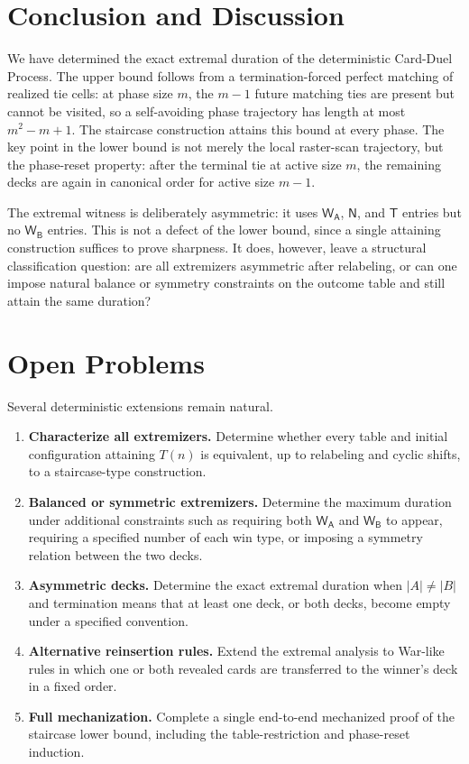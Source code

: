 \documentclass[12pt]{article}
\newcommand{\WA}{\mathsf{W_A}}
\newcommand{\WB}{\mathsf{W_B}}
\newcommand{\TT}{\mathsf{T}}
\newcommand{\NN}{\mathsf{N}}
\begin{document}
\section{Conclusion and Discussion}
We have determined the exact extremal duration of the deterministic Card-Duel Process. The upper bound follows from a termination-forced perfect matching of realized tie cells: at phase size $m$, the $m-1$ future matching ties are present but cannot be visited, so a self-avoiding phase trajectory has length at most $m^2-m+1$. The staircase construction attains this bound at every phase. The key point in the lower bound is not merely the local raster-scan trajectory, but the phase-reset property: after the terminal tie at active size $m$, the remaining decks are again in canonical order for active size $m-1$.

The extremal witness is deliberately asymmetric: it uses $\WA$, $\NN$, and $\TT$ entries but no $\WB$ entries. This is not a defect of the lower bound, since a single attaining construction suffices to prove sharpness. It does, however, leave a structural classification question: are all extremizers asymmetric after relabeling, or can one impose natural balance or symmetry constraints on the outcome table and still attain the same duration?

\section{Open Problems}
Several deterministic extensions remain natural.
\begin{enumerate}[label=\arabic*.]
    \item \textbf{Characterize all extremizers.} Determine whether every table and initial configuration attaining $T(n)$ is equivalent, up to relabeling and cyclic shifts, to a staircase-type construction.
    \item \textbf{Balanced or symmetric extremizers.} Determine the maximum duration under additional constraints such as requiring both $\WA$ and $\WB$ to appear, requiring a specified number of each win type, or imposing a symmetry relation between the two decks.
    \item \textbf{Asymmetric decks.} Determine the exact extremal duration when $|A|\ne |B|$ and termination means that at least one deck, or both decks, become empty under a specified convention.
    \item \textbf{Alternative reinsertion rules.} Extend the extremal analysis to War-like rules in which one or both revealed cards are transferred to the winner's deck in a fixed order.
    \item \textbf{Full mechanization.} Complete a single end-to-end mechanized proof of the staircase lower bound, including the table-restriction and phase-reset induction.
\end{enumerate}
\end{document}
